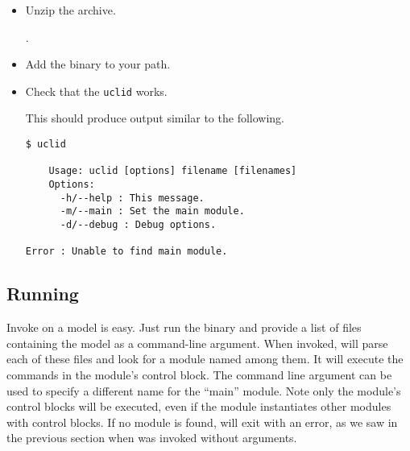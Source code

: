 \begin{itemize}
  \item Unzip the archive.

  .

\begin{comment}
  This should produce output similar to the following.
\begin{Verbatim}[frame=single]
Archive:  uclid-0.9.5.zip
  inflating: uclid-0.9.5/lib/default.uclid-0.9.5.jar  
  inflating: uclid-0.9.5/lib/com.microsoft.z3.jar  
  inflating: uclid-0.9.5/lib/org.scala-lang.scala-library-2.12.0.jar  
  inflating: uclid-0.9.5/lib/org.scala-lang.modules.scala-parser-combinators_2.12-1.0.6.jar  
  inflating: uclid-0.9.5/lib/org.scalactic.scalactic_2.12-3.0.1.jar  
  inflating: uclid-0.9.5/lib/org.scala-lang.scala-reflect-2.12.0.jar  
  inflating: uclid-0.9.5/bin/uclid     
  inflating: uclid-0.9.5/bin/uclid.bat  
\end{Verbatim}
\end{comment}


  \item Add the  binary to your path.


  \item Check that the \texttt{uclid} works.


  This should produce output similar to the following.
\begin{Verbatim}[frame=single, samepage=true]
$ uclid

    Usage: uclid [options] filename [filenames]
    Options:
      -h/--help : This message.
      -m/--main : Set the main module.
      -d/--debug : Debug options.
  
Error : Unable to find main module.
\end{Verbatim}
\end{itemize}

\subsection{Running \uclid{}}

Invoke \uclid{} on a model is easy. Just run the  binary and provide a list of files containing the model as a command-line argument. When invoked, \uclid{} will parse each of these files and look for a module named  among them. It will execute the commands in the  module's control block. The  command line argument can be used to specify a different name for the ``main'' module. Note only the  module's control blocks will be executed, even if the  module instantiates other modules with control blocks. If no  module is found, \uclid{} will exit with an error, as we saw in the previous section when  was invoked without arguments.

